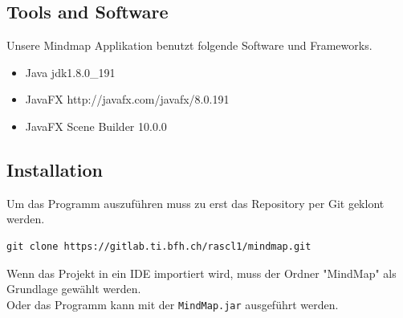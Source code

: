\subsection{Tools and Software}
\label{subsec:tools}
Unsere Mindmap Applikation benutzt folgende Software und Frameworks.
\begin{itemize}
\item Java jdk1.8.0\_{}191
\item JavaFX http://javafx.com/javafx/8.0.191
\item JavaFX Scene Builder 10.0.0
\end{itemize}

\subsection{Installation}
Um das Programm auszuführen muss zu erst das Repository per Git geklont werden.
\begin{verbatim}
git clone https://gitlab.ti.bfh.ch/rascl1/mindmap.git
\end{verbatim}
Wenn das Projekt in ein IDE importiert wird, muss der Ordner "{}MindMap"{} als Grundlage gewählt werden.\\
Oder das Programm kann mit der \texttt{MindMap.jar} ausgeführt werden.




